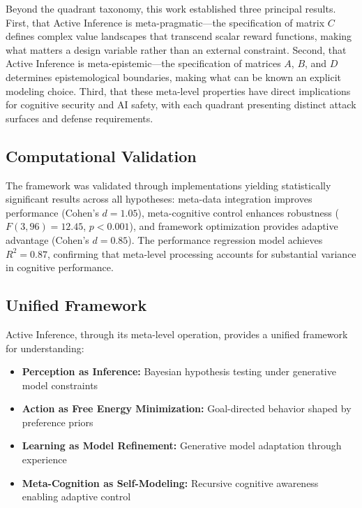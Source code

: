 \documentclass[
]{article}
\providecommand{\tightlist}{%
  \setlength{\itemsep}{0pt}\setlength{\parskip}{0pt}}
\begin{document}
Beyond the quadrant taxonomy, this work established three principal
results. First, that Active Inference is meta-pragmatic---the
specification of matrix \(C\) defines complex value landscapes that
transcend scalar reward functions, making what matters a design variable
rather than an external constraint. Second, that Active Inference is
meta-epistemic---the specification of matrices \(A\), \(B\), and \(D\)
determines epistemological boundaries, making what can be known an
explicit modeling choice. Third, that these meta-level properties have
direct implications for cognitive security and AI safety, with each
quadrant presenting distinct attack surfaces and defense requirements.

\subsection{Computational Validation}\label{computational-validation-1}

The framework was validated through implementations yielding
statistically significant results across all hypotheses: meta-data
integration improves performance (Cohen's \(d = 1.05\)), meta-cognitive
control enhances robustness (\(F(3,96) = 12.45\), \(p < 0.001\)), and
framework optimization provides adaptive advantage (Cohen's
\(d = 0.85\)). The performance regression model achieves \(R^2 = 0.87\),
confirming that meta-level processing accounts for substantial variance
in cognitive performance.

\subsection{Unified Framework}\label{unified-framework}

Active Inference, through its meta-level operation, provides a unified
framework for understanding:

\begin{itemize}
\tightlist
\item
  \textbf{Perception as Inference:} Bayesian hypothesis testing under
  generative model constraints
\item
  \textbf{Action as Free Energy Minimization:} Goal-directed behavior
  shaped by preference priors
\item
  \textbf{Learning as Model Refinement:} Generative model adaptation
  through experience
\item
  \textbf{Meta-Cognition as Self-Modeling:} Recursive cognitive
  awareness enabling adaptive control
\end{itemize}
\end{document}
